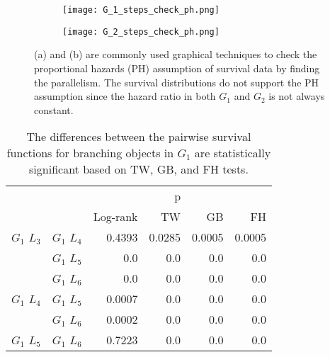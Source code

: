        \begin{figure}
        \centering
        \begin{subfigure}[b]{0.45\textwidth}
          \texttt{[image: G\_1\_steps\_check\_ph.png]}
          \caption{}
          \label{fig:g1_steps_check_ph}
        \end{subfigure}
        \hfill
        \begin{subfigure}[b]{0.45\textwidth}
          \texttt{[image: G\_2\_steps\_check\_ph.png]}
          \caption{}
          \label{fig:g1_steps_check_ph}
        \end{subfigure}
        \caption{(a) and (b) are commonly used graphical techniques to
          check the proportional hazards (PH) assumption of survival data
          by finding the parallelism. The survival distributions do
          not support the PH assumption since the
          hazard ratio in both $G_1$ and $G_2$ is not always constant.}
        \label{fig:branch_steps_check_ph}
       \end{figure}
       
             
      \begin{table}
        \centering
        \begin{tabular}{llrrrr}
          \toprule
                       &             &         &  p &    &     \\
          \cmidrule{3-6}
                       &             & Log-rank & TW & GB & FH  \\
          \midrule
          $G_1$ $L_3$  & $G_1$ $L_4$  &  0.4393 &  0.0285 &  0.0005 &  0.0005     \\
                       & $G_1$ $L_5$  & 0.0 & 0.0 & 0.0 & 0.0    \\
                       & $G_1$ $L_6$  & 0.0 & 0.0 & 0.0 & 0.0      \\
          $G_1$ $L_4$  & $G_1$ $L_5$  & 0.0007 & 0.0 & 0.0 & 0.0      \\
                       & $G_1$ $L_6$  & 0.0002 & 0.0 & 0.0 & 0.0       \\
          $G_1$ $L_5$   & $G_1$ $L_6$ & 0.7223 &  0.0 & 0.0 & 0.0      \\
          \bottomrule
        \end{tabular}
        \caption{The differences between the pairwise survival
          functions for branching objects in $G_1$ are statistically
          significant based on TW, GB, and FH tests.}
         \label{tab:g1_ingroup_tests_steps}
      \end{table}


